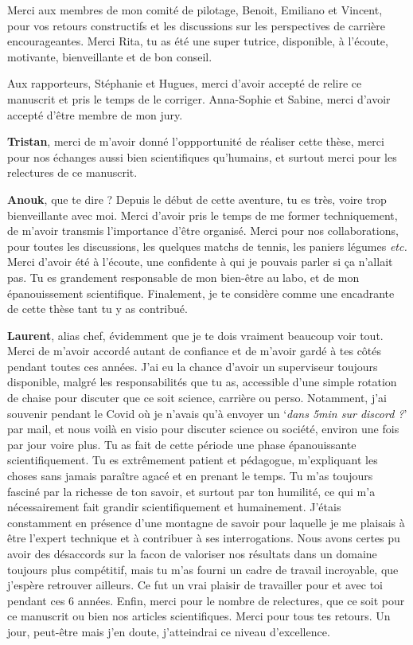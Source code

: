 Merci aux membres de mon comité de pilotage, Benoit, Emiliano et Vincent, pour vos retours constructifs et les discussions sur les perspectives de carrière encourageantes. Merci Rita, tu as été une super tutrice, disponible, à l'écoute, motivante, bienveillante et de bon conseil.

Aux rapporteurs, Stéphanie et Hugues, merci d'avoir accepté de relire ce manuscrit et pris le temps de le corriger. Anna-Sophie et Sabine, merci d'avoir accepté d'être membre de mon jury.

\vspace*{7pt}
\textbf{Tristan}, merci de m'avoir donné l'oppportunité de réaliser cette thèse, merci pour nos échanges aussi bien scientifiques qu'humains, et surtout merci pour les relectures de ce manuscrit.

\vspace*{7pt}
\textbf{Anouk}, que te dire ? Depuis le début de cette aventure, tu es très, voire trop bienveillante avec moi. Merci d'avoir pris le temps de me former techniquement, de m'avoir transmis l'importance d'être organisé. Merci pour nos collaborations, pour toutes les discussions, les quelques matchs de tennis, les paniers légumes \textit{etc.} Merci d'avoir été à l'écoute, une confidente à qui je pouvais parler si ça n'allait pas. Tu es grandement responsable de mon bien-être au labo, et de mon épanouissement scientifique. Finalement, je te considère comme une encadrante de cette thèse tant tu y as contribué.


\vspace*{7pt}
\textbf{Laurent}, alias chef, évidemment que je te dois vraiment beaucoup voir tout. Merci de m'avoir accordé autant de confiance et de m'avoir gardé à tes côtés pendant toutes ces années.
J'ai eu la chance d'avoir un superviseur toujours disponible, malgré les responsabilités que tu as, accessible d'une simple rotation de chaise pour discuter que ce soit science, carrière ou perso. Notamment, j'ai souvenir pendant le Covid où je n'avais qu'à envoyer un `\textit{dans 5min sur discord ?}' par mail, et nous voilà en visio pour discuter science ou société, environ une fois par jour voire plus. Tu as fait de cette période une phase épanouissante scientifiquement.
Tu es extrêmement patient et pédagogue, m'expliquant les choses sans jamais paraître agacé et en prenant le temps. Tu m'as toujours fasciné par la richesse de ton savoir, et surtout par ton humilité, ce qui m'a nécessairement fait grandir scientifiquement et humainement. 
J'étais constamment en présence d'une montagne de savoir pour laquelle je me plaisais à être l'expert technique et à contribuer à ses interrogations. Nous avons certes pu avoir des désaccords sur la facon de valoriser nos résultats dans un domaine toujours plus compétitif, mais tu m'as fourni un cadre de travail incroyable, que j'espère retrouver ailleurs. Ce fut un vrai plaisir de travailler pour et avec toi pendant ces 6 années. 
Enfin, merci pour le nombre de relectures, que ce soit pour ce manuscrit ou bien nos articles scientifiques. Merci pour tous tes retours. Un jour, peut-être mais j'en doute, j'atteindrai ce niveau d'excellence. 


